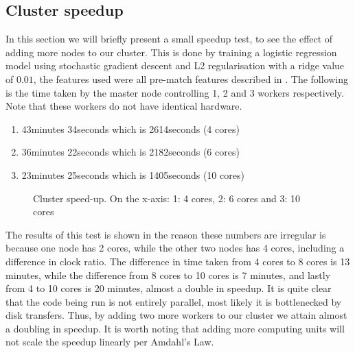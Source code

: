 \subsection{Cluster speedup}\label{sec:speedup}
In this section we will briefly present a small speedup test, to see the effect of adding more nodes to our cluster. This is done by training a logistic regression model using stochastic gradient descent and L2 regularisation with a ridge value of $0.01$, the features used were all pre-match features described in . The following is the time taken by the master node controlling 1, 2 and 3 workers respectively. Note that these workers do not have identical hardware.

\begin{enumerate}
    \item 43minutes 34seconds which is 2614seconds (4 cores)
    \item 36minutes 22seconds which is 2182seconds (6 cores)
    \item 23minutes 25seconds which is 1405seconds (10 cores)
\end{enumerate}

\begin{figure}[!htb]
  \centering
   \caption{Cluster speed-up. On the x-axis: 1: 4 cores, 2: 6 cores and 3: 10 cores}\label{fig:cluster-speedup}
\end{figure}
The results of this test is shown in  the reason these numbers are irregular is because one node has 2 cores, while the other two nodes has 4 cores, including a difference in clock ratio. The difference in time taken from 4 cores to 8 cores is 13 minutes, while the difference from 8 cores to 10 cores is 7 minutes, and lastly from 4 to 10 cores is 20 minutes, almost a double in speedup. It is quite clear that the code being run is not entirely parallel, most likely it is bottlenecked by disk transfers. Thus, by adding two more workers to our cluster we attain almost a doubling in speedup. It is worth noting that adding more computing units will not scale the speedup linearly per Amdahl's Law. 

